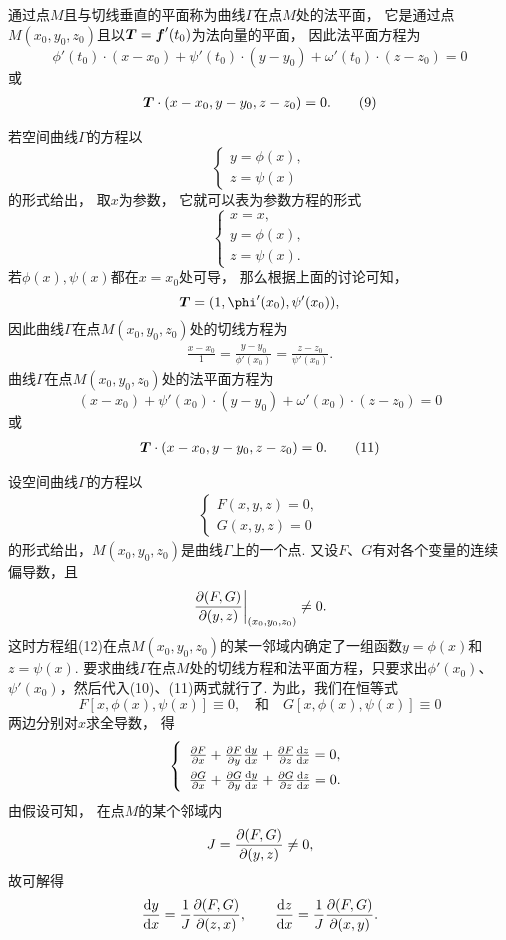 通过点\(M\)且与切线垂直的平面称为曲线\(\Gamma\)在点\(M\)处的法平面，
它是通过点\(M(x_0,y_0,z_0)\)且以\(\boldsymbol{T}=\boldsymbol{f}'(t_0)\)为法向量的平面，
因此法平面方程为\[
	\phi'(t_0) \cdot (x-x_0) + \psi'(t_0) \cdot (y-y_0) + \omega'(t_0) \cdot (z-z_0) = 0
\]
或\begin{gather}
	\vb{T}\cdot(x-x_0,y-y_0,z-z_0)=0.
	\tag9
\end{gather}

若空间曲线\(\Gamma\)的方程以\[
	\left\{ \begin{array}{l}
		y = \phi(x), \\
		z = \psi(x)
	\end{array} \right.
\]的形式给出，
取\(x\)为参数，
它就可以表为参数方程的形式\[
	\left\{ \begin{array}{l}
		x = x, \\
		y = \phi(x), \\
		z = \psi(x).
	\end{array} \right.
\]
若\(\phi(x),\psi(x)\)都在\(x=x_0\)处可导，
那么根据上面的讨论可知，\[
	\vb{T} = (1,\phi'(x_0),\psi'(x_0)),
\]
因此曲线\(\Gamma\)在点\(M(x_0,y_0,z_0)\)处的切线方程为
\begin{gather}
	\frac{x-x_0}{1}
	=\frac{y-y_0}{\phi'(x_0)}
	=\frac{z-z_0}{\psi'(x_0)}.
	\tag{10}
\end{gather}
曲线\(\Gamma\)在点\(M(x_0,y_0,z_0)\)处的法平面方程为\[
	(x-x_0) + \psi'(x_0) \cdot (y-y_0) + \omega'(x_0) \cdot (z-z_0) = 0
\]或\begin{gather}
	\boldsymbol{T}\cdot(x-x_0,y-y_0,z-z_0)=0.
	\tag{11}
\end{gather}

设空间曲线\(\Gamma\)的方程以\begin{gather}
\left\{ \begin{array}{l}
F(x,y,z)=0, \\
G(x,y,z)=0
\end{array} \right.
\tag{12}
\end{gather}的形式给出，\(M(x_0,y_0,z_0)\)是曲线\(\Gamma\)上的一个点.
又设\(F\)、\(G\)有对各个变量的连续偏导数，且\[
\eval{\jacobi{F,G}{y,z}}_{(x_0,y_0,z_0)} \neq 0.
\]这时方程组(12)在点\(M(x_0,y_0,z_0)\)的某一邻域内确定了一组函数\(y=\phi(x)\)和\(z=\psi(x)\).
要求曲线\(\Gamma\)在点\(M\)处的切线方程和法平面方程，只要求出\(\phi'(x_0)\)、\(\psi'(x_0)\)，然后代入(10)、(11)两式就行了.
为此，我们在恒等式\[
	F[x,\phi(x),\psi(x)] \equiv 0,
	\quad\text{和}\quad
	G[x,\phi(x),\psi(x)] \equiv 0
\]两边分别对\(x\)求全导数，
得\[
	\left\{ \def\arraystretch{1.5} \begin{array}{l}
		\pdv{F}{x} + \pdv{F}{y} \dv{y}{x} + \pdv{F}{z} \dv{z}{x} = 0, \\
		\pdv{G}{x} + \pdv{G}{y} \dv{y}{x} + \pdv{G}{z} \dv{z}{x} = 0.
	\end{array} \right.
\]
由假设可知，
在点\(M\)的某个邻域内\[
	J = \pdv{ (F,G) }{ (y,z) } \neq 0,
\]
故可解得\[
	\dv{y}{x} = \frac{1}{J} \pdv{ (F,G) }{ (z,x) },
	\qquad
	\dv{z}{x} = \frac{1}{J} \pdv{ (F,G) }{ (x,y) }.
\]

